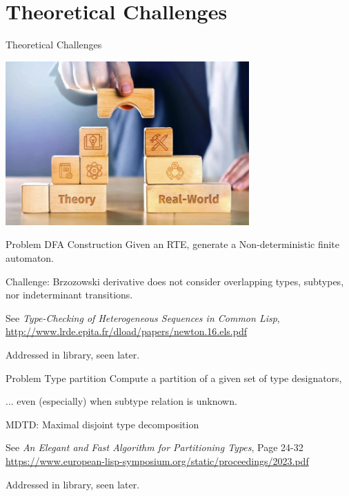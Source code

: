 \section{Theoretical Challenges}

{  
  \begin{frame}{Theoretical Challenges}
      
  \centering
  \includegraphics[width=0.7\textwidth]{theoretic-challenge.png}
\end{frame}
}

\begin{frame}{Problem }{DFA Construction}
  Given an RTE, generate a Non-deterministic finite automaton.

  \medskip
  
  Challenge: Brzozowski derivative does not consider overlapping types, subtypes, nor indeterminant transitions.

  \medskip
  
  See \emph{Type-Checking of Heterogeneous Sequences in Common Lisp}, \url{http://www.lrde.epita.fr/dload/papers/newton.16.els.pdf}

  \medskip

  Addressed in  library, seen later.
\end{frame}

\begin{frame}{Problem }{Type partition}
  Compute a partition of a given set of type designators,

  \medskip
  
  ... even (especially) when subtype relation is unknown.

  \medskip
  
  MDTD: Maximal disjoint type decomposition

  \medskip
  
  See \emph{An Elegant and Fast Algorithm for Partitioning Types}, Page 24-32 \url{https://www.european-lisp-symposium.org/static/proceedings/2023.pdf}

  \medskip
  
  Addressed in  library, seen later.
\end{frame}

